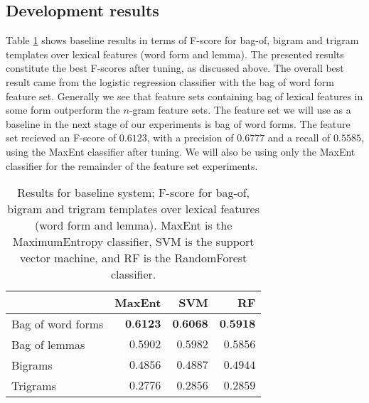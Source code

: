 \documentclass[11pt,letterpaper]{article}
\begin{document}
\subsection{Development results}
Table \ref{tab:baseline} shows baseline results in terms of F-score
for bag-of, bigram and trigram templates over lexical features (word
form and lemma). The presented results constitute the best F-scores
after tuning, as discussed above. The
overall best result came from the logistic regression classifier with
the bag of word form feature set. Generally we see that feature sets
containing bag of lexical features in some form outperform the
$n$-gram feature sets.
The feature set we will use as a baseline in the next stage of our
experiments is bag of word forms. The feature set recieved an F-score
of $0.6123$, with a precision of $0.6777$ and a recall of $0.5585$,
using the MaxEnt classifier after tuning. We will also be
using only the MaxEnt classifier for the remainder of the
feature set experiments.
\begin{table}
  \begin{center}
    \begin{tabular}{lrrr}
      \toprule

      & MaxEnt & SVM & RF \\
      \midrule
      Bag of word forms & $\textbf{0.6123}$ & $\textbf{0.6068}$ & $\textbf{0.5918}$ \\ %
      Bag of lemmas & $0.5902$ & $0.5982$ & $0.5856$ \\
      Bigrams & $0.4856$ & $0.4887$ & $0.4944$ \\
      Trigrams & $0.2776$ & $0.2856$ & $0.2859$ \\
      
      
      \bottomrule
    \end{tabular}
  \end{center}
  \caption{Results for baseline system; F-score for bag-of, bigram and trigram templates over lexical features (word form and lemma). MaxEnt is the MaximumEntropy classifier, SVM is the support vector machine, and RF is the RandomForest classifier.}
  \label{tab:baseline}
\end{table}
\end{document}
